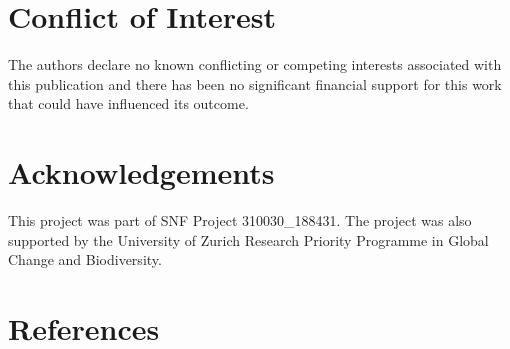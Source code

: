 \documentclass[
]{article}
\begin{document}
\hypertarget{conflict-of-interest}{%
\section{Conflict of Interest}\label{conflict-of-interest}}

The authors declare no known conflicting or competing interests
associated with this publication and there has been no significant
financial support for this work that could have influenced its outcome.

\hypertarget{acknowledgements}{%
\section{Acknowledgements}\label{acknowledgements}}

This project was part of SNF Project 310030\_188431. The project was
also supported by the University of Zurich Research Priority Programme
in Global Change and Biodiversity.

\hypertarget{references}{%
\section*{References}\label{references}}
\end{document}
